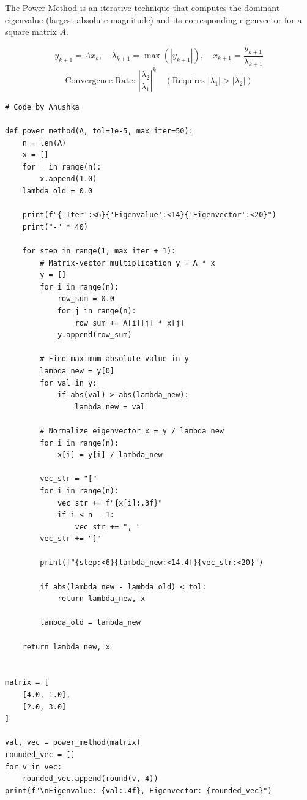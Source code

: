 \documentclass[10pt,a4paper]{report}
\begin{document}
The Power Method is an iterative technique that computes the dominant eigenvalue (largest absolute magnitude) and its corresponding eigenvector for a square matrix $A$.

\begin{tcolorbox}[colback=theorybg,colframe=theoryframe,title=\textbf{Mathematical Theory \& Formulation},boxrule=1pt,arc=2mm]
\[
y_{k+1} = A x_k, \quad \lambda_{k+1} = \max(|y_{k+1}|), \quad x_{k+1} = \frac{y_{k+1}}{\lambda_{k+1}}
\]
\[
\text{Convergence Rate: } \left|\frac{\lambda_2}{\lambda_1}\right|^k \quad (\text{Requires } |\lambda_1| > |\lambda_2|)
\]
\end{tcolorbox}

\begin{tcolorbox}[colback=codebg,colframe=secondary,title=\textbf{Python Implementation (Step-by-Step Loops \& Pure Functions)},boxrule=1pt,arc=2mm]
\begin{lstlisting}[style=python_detailed]
# Code by Anushka

def power_method(A, tol=1e-5, max_iter=50):
    n = len(A)
    x = []
    for _ in range(n):
        x.append(1.0)
    lambda_old = 0.0

    print(f"{'Iter':<6}{'Eigenvalue':<14}{'Eigenvector':<20}")
    print("-" * 40)

    for step in range(1, max_iter + 1):
        # Matrix-vector multiplication y = A * x
        y = []
        for i in range(n):
            row_sum = 0.0
            for j in range(n):
                row_sum += A[i][j] * x[j]
            y.append(row_sum)

        # Find maximum absolute value in y
        lambda_new = y[0]
        for val in y:
            if abs(val) > abs(lambda_new):
                lambda_new = val

        # Normalize eigenvector x = y / lambda_new
        for i in range(n):
            x[i] = y[i] / lambda_new

        vec_str = "["
        for i in range(n):
            vec_str += f"{x[i]:.3f}"
            if i < n - 1:
                vec_str += ", "
        vec_str += "]"

        print(f"{step:<6}{lambda_new:<14.4f}{vec_str:<20}")

        if abs(lambda_new - lambda_old) < tol:
            return lambda_new, x

        lambda_old = lambda_new

    return lambda_new, x


matrix = [
    [4.0, 1.0],
    [2.0, 3.0]
]

val, vec = power_method(matrix)
rounded_vec = []
for v in vec:
    rounded_vec.append(round(v, 4))
print(f"\nEigenvalue: {val:.4f}, Eigenvector: {rounded_vec}")

\end{lstlisting}
\end{tcolorbox}
\end{document}
